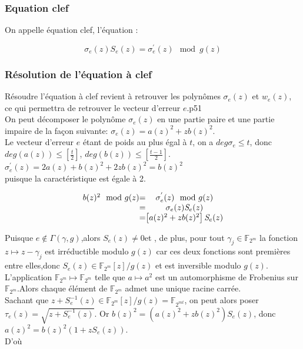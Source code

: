 \documentclass[12pt,openany]{report}
\begin{document}
 \subsubsection{ Equation clef}
 On appelle équation clef, l'équation :

 \begin{equation}
  \sigma_e(z)\mathit{S}_e(z)=\sigma_e^{'}(z) \mod g(z) 
 \end{equation}
 \subsubsection{Résolution de l'équation à clef}
 Résoudre l'équation à clef revient à retrouver les polynômes $\sigma_e(z)$ et $w_e(z)$, ce qui permettra de retrouver le vecteur d'erreur $e$.\cite{Ndollane}p51\\
 On peut décomposer le polynôme $\sigma_e(z)$ en une partie paire et une partie impaire de la façon suivante:
 $\sigma_e(z)=a(z)^2 + zb(z)^2   $.\\
 Le vecteur d'erreur $e$ étant de poids au plus égal à $t$, on a $ deg \sigma_e \leq t $,
 donc $deg(a(z))\leq \left[ \frac{t}{2}  \right]   $, $deg(b(z))\leq \left[ \frac{t-1}{2}  \right]$.\\
 
 $\sigma_e^{'}(z)=2a(z) + b(z)^2+ 2zb(z)^2=b(z)^2 $ \\ puisque la caractéristique est égale à 2.
\begin{center}
 \[
\left.
\begin{array}{c @{=} c}
     b(z)^2 \mod g(z)& \sigma_e^{'}(z) \mod g(z)\\
   &\sigma_{e}(z)\mathit{S}_{e}(z) \\
    &\left[  a(z)^2 + zb(z)^2
    \right] \mathit{S}_{e}(z)
\end{array}
\right.
\] 


 \end{center}
 
 Puisque $e \notin \Gamma(\gamma,g)$,alors $\mathit{S}_{e}(z)\neq 0 $et , de plus, pour tout $\gamma_j \in \mathbb{F}_{2^m}$ la fonction $z \longmapsto z-\gamma_j $
 est irréductible modulo $g(z)$ car ces deux fonctions sont premières entre elles,donc $\mathit{S}_{e}(z)\in \mathbb{F}_{2^m}[z]/ g(z)$ et est inversible modulo $g(z)$.\\
 L'application $\mathbb{F}_{2^m} \mapsto \mathbb{F}_{2^m}   $ telle que $ a \mapsto a^2$ est un automorphisme de Frobenius sur $\mathbb{F}_{2^m}$.Alors chaque élément de $\mathbb{F}_{2^m}$ admet une unique racine carrée.\\
 Sachant que $ z + \mathit{S}_{e}^{-1}(z) \in \mathbb{F}_{2^m}[z]/ g(z)=\mathbb{F}_{2^{mt}}  $, on peut alors poser $ \tau_{e}(z)=\sqrt{z + \mathit{S}_{e}^{-1}(z) } $. Or $b(z)^{2}=\left(  a(z)^2 + zb(z)^2 \right) \mathit{S}_{e}(z)  $, donc $ a(z)^{2}= b(z)^2 \left(  1 + z\mathit{S}_{e}(z) \right)$.\\
 D'où
 
\end{document}
